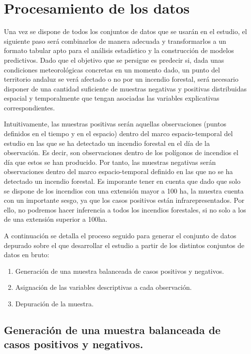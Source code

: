 \documentclass[12pt,a4paper,]{book}
\providecommand{\tightlist}{%
  \setlength{\itemsep}{0pt}\setlength{\parskip}{0pt}}
\numberwithin{dummy}{section}
\theoremstyle{ocrenumbox}
\theoremstyle{blacknumex}
\theoremstyle{blacknumbox}
\theoremstyle{ocrenum}
\theoremstyle{ocrenum}
\begin{document}
\hypertarget{procesamiento-de-los-datos}{%
\section{Procesamiento de los datos}\label{procesamiento-de-los-datos}}

Una vez se dispone de todos los conjuntos de datos que se usarán en el
estudio, el siguiente paso será combinarlos de manera adecuada y
transformarlos a un formato tabular apto para el análisis estadístico y
la construcción de modelos predictivos. Dado que el objetivo que se
persigue es predecir si, dada unas condiciones meteorológicas concretas
en un momento dado, un punto del territorio andaluz se verá afectado o
no por un incendio forestal, será necesario disponer de una cantidad
suficiente de muestras negativas y positivas distribuidas espacial y
temporalmente que tengan asociadas las variables explicativas
correspondientes.

Intuitivamente, las muestras positivas serán aquellas observaciones
(puntos definidos en el tiempo y en el espacio) dentro del marco
espacio-temporal del estudio en las que se ha detectado un incendio
forestal en el día de la observación. Es decir, son observaciones dentro
de los polígonos de incendios el día que estos se han producido. Por
tanto, las muestras negativas serán observaciones dentro del marco
espacio-temporal definido en las que no se ha detectado un incendio
forestal. Es imporante tener en cuenta que dado que solo se dispone de
los incendios con una extensión mayor a 100 ha, la muestra cuenta con un
importante sesgo, ya que los casos positivos están infrarepresentados.
Por ello, no podremos hacer inferencia a todos los incendios forestales,
si no solo a los de una extensión superior a 100ha.

A continuación se detalla el proceso seguido para generar el conjunto de
datos depurado sobre el que desarrollar el estudio a partir de los
distintos conjuntos de datos en bruto:

\begin{enumerate}
\def\labelenumi{\arabic{enumi}.}
\tightlist
\item
  Generación de una muestra balanceada de casos positivos y negativos.
\item
  Asignación de las variables descriptivas a cada observación.
\item
  Depuración de la muestra.
\end{enumerate}

\hypertarget{generaciuxf3n-de-una-muestra-balanceada-de-casos-positivos-y-negativos.}{%
\subsection{Generación de una muestra balanceada de casos positivos y
negativos.}\label{generaciuxf3n-de-una-muestra-balanceada-de-casos-positivos-y-negativos.}}
\end{document}
